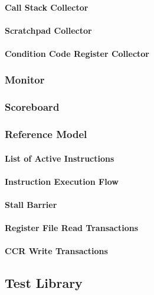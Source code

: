 \paragraph{Call Stack Collector}

\paragraph{Scratchpad Collector}

\paragraph{Condition Code Register Collector}

\subsubsection{Monitor}

\subsubsection{Scoreboard}

\subsubsection{Reference Model}

\paragraph{List of Active Instructions}

\paragraph{Instruction Execution Flow}

\paragraph{Stall Barrier}

\paragraph{Register File Read Transactions}

\paragraph{CCR Write Transactions}

\subsection{Test Library}
